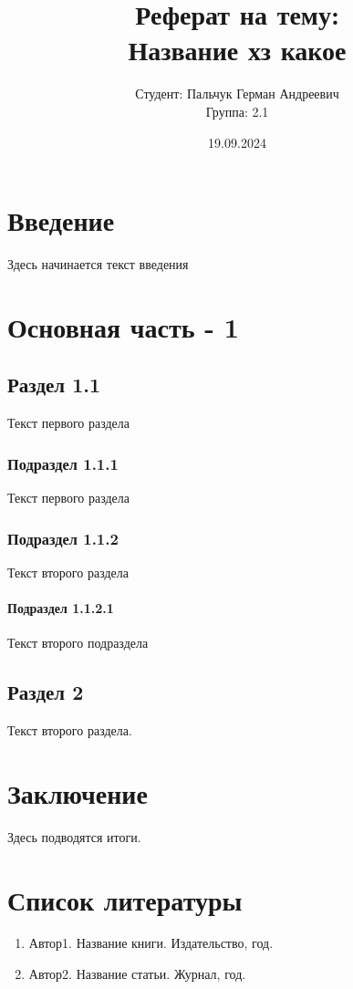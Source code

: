 \documentclass[14pt]{extreport}
\title{Реферат на тему: \\[0.5cm] \textbf{Название хз какое}}
\author{Студент: Пальчук Герман Андреевич \\ Группа: 2.1}
\date{19.09.2024}
\begin{document}
\maketitle
\tableofcontents

\chapter{Введение}
Здесь начинается текст введения

\chapter{Основная часть - 1}
\section{Раздел 1.1}
Текст первого раздела

\subsection{Подраздел 1.1.1}
Текст первого раздела 

\subsection{Подраздел 1.1.2}
Текст второго раздела 

\subsubsection{Подраздел 1.1.2.1}
Текст второго подраздела 

\section{Раздел 2}
Текст второго раздела.

\chapter{Заключение}
Здесь подводятся итоги.

\chapter{Список литературы}
\begin{enumerate}
\item Автор1. Название книги. Издательство, год.
\item Автор2. Название статьи. Журнал, год.
\end{enumerate}
\end{document}
